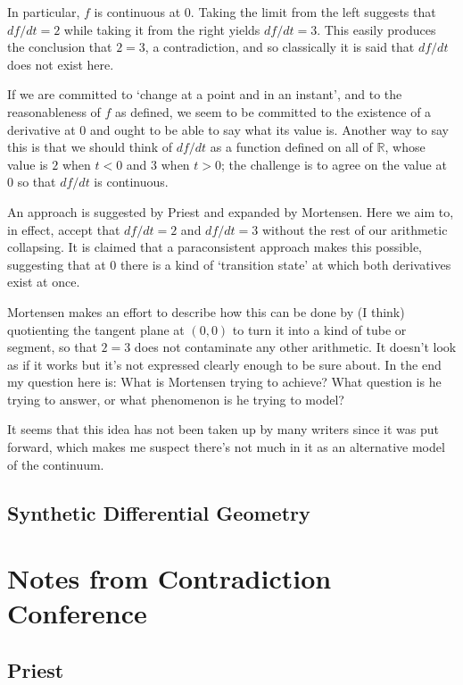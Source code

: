 \documentclass[oneside,english]{article}
\theoremstyle{plain}
\theoremstyle{definition}
\theoremstyle{definition}
\begin{document}
In particular, $f$ is continuous at $0$. Taking the limit from the left suggests that $df/dt = 2$ while taking it from the right yields $df/dt = 3$. This easily produces the conclusion that $2 = 3$, a contradiction, and so classically it is said that $df/dt$ does not exist here.

If we are committed to `change at a point and in an instant', and to the reasonableness of $f$ as defined, we seem to be committed to the existence of a derivative at $0$ and ought to be able to say what its value is. Another way to say this is that we should think of $df/dt$ as a function defined on all of $\mathbb{R}$, whose value is $2$ when $t < 0$ and $3$ when $t > 0$; the challenge is to agree on the value at 0 so that $df/dt$ is continuous.

An approach is suggested by Priest and expanded by Mortensen. Here we aim to, in effect, accept that $df/dt = 2$ and $df/dt = 3$ without the rest of our arithmetic collapsing. It is claimed that a paraconsistent approach makes this possible, suggesting that at $0$ there is a kind of `transition state' at which both derivatives exist at once.

Mortensen makes an effort to describe how this can be done by (I think) quotienting the tangent plane at $(0, 0)$ to turn it into a kind of tube or segment, so that $2 = 3$ does not contaminate any other arithmetic. It doesn't look as if it works but it's not expressed clearly enough to be sure about. In the end my question here is: What is Mortensen trying to achieve? What question is he trying to answer, or what phenomenon is he trying to model?

It seems that this idea has not been taken up by many writers since it was put forward, which makes me suspect there's not much in it as an alternative model of the continuum.

\subsection{Synthetic Differential Geometry}


\section{Notes from Contradiction Conference}

\subsection{Priest}
\end{document}

